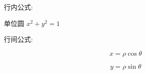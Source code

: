 \documentclass[UTF8]{ctexart}
\begin{document}
行内公式: 

单位圆 $x^2+y^2=1$

行间公式:

\[
  x=\rho\cos\theta
\]

\begin{equation}
  y=\rho\sin\theta
\end{equation}
\end{document}
